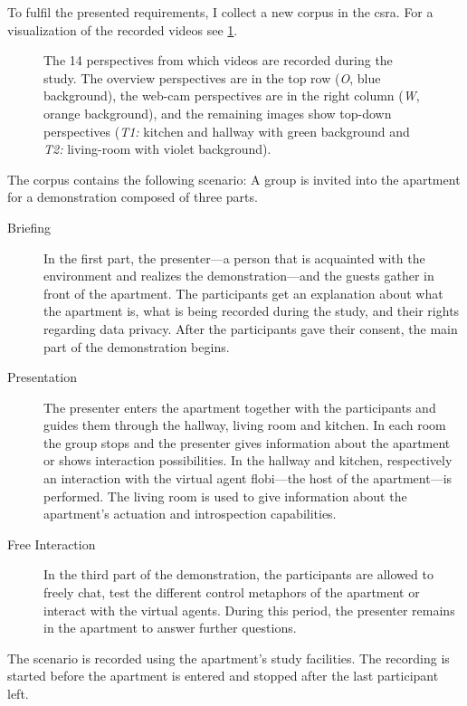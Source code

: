 To fulfil the presented requirements, I collect a new corpus in the \gls{csra}.
For a visualization of the recorded videos see \cref{fig:group-perspectives}.
\begin{figure}[htb]
  \centering
    \def\svgwidth{\textwidth}
    
    \caption[Group detection study video perspectives.]{\label{fig:group-perspectives} The 14 perspectives from which videos are recorded during the study. 
    The overview perspectives are in the top row (\emph{O}, blue background), 
    the web-cam perspectives are in the right column (\emph{W}, orange background), and the remaining images show top-down perspectives (\emph{T1:} kitchen and hallway with green background and \emph{T2:} living-room with violet background).
    }
\end{figure}
The corpus contains the following scenario:
A group is invited into the \gls{apartment} for a demonstration composed of three parts.
\begin{description}
    \item[Briefing] In the first part, the presenter---a person that is acquainted with the environment and realizes the demonstration---and the guests ga\-ther in front of the \gls{apartment}.
    The participants get an explanation about what the \gls{apartment} is, what is being recorded during the study, and their rights regarding data privacy.
    After the participants gave their consent, the main part of the demonstration begins.
    \item[Presentation] The presenter enters the \gls{apartment} together with the participants and guides them through the hallway, living room and kitchen.
    In each room the group stops and the presenter gives information about the \gls{apartment} or shows interaction possibilities.
    In the hallway and kitchen, respectively an interaction with the \gls{virtual agent} \gls{flobi}---the host of the \gls{apartment}---is performed.
    The living room is used to give information about the \gls{apartment}'s actuation and introspection capabilities.
    \item[Free Interaction] In the third part of the demonstration, the participants are allowed to freely chat, test the different control metaphors of the \gls{apartment} or interact with the \glspl{virtual agent}.
    During this period, the presenter remains in the \gls{apartment} to answer further questions.
\end{description}
The scenario is recorded using the \gls{apartment}'s study facilities.
The recording is started before the \gls{apartment} is entered and stopped after the last participant left.

